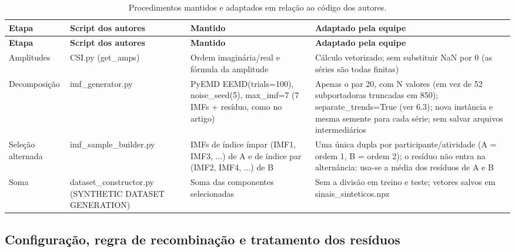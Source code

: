 {\footnotesize
\begin{longtable}{|>{\centering\arraybackslash}p{1.92cm}|>{\centering\arraybackslash}p{2.76cm}|>{\centering\arraybackslash}p{4.18cm}|>{\centering\arraybackslash}p{5.35cm}|}
\caption{Procedimentos mantidos e adaptados em relação ao código dos autores.}\\
\hline
\textbf{Etapa} & \textbf{Script dos autores} & \textbf{Mantido} & \textbf{Adaptado pela equipe} \\ \hline
\endfirsthead
\hline
\textbf{Etapa} & \textbf{Script dos autores} & \textbf{Mantido} & \textbf{Adaptado pela equipe} \\ \hline
\endhead
Amplitudes & CSI.py (get\_amps) & Ordem imaginária/real e fórmula da amplitude & Cálculo vetorizado; sem substituir NaN por 0 (as séries são todas finitas) \\ \hline
Decomposição & imf\_generator.py & PyEMD EEMD(trials=100), noise\_seed(5), max\_imf=7 (7 IMFs + resíduo, como no artigo) & Apenas o par 20, com N valores (em vez de 52 subportadoras truncadas em 850); separate\_trends=True (ver 6.3); nova instância e mesma semente para cada série; sem salvar arquivos intermediários \\ \hline
Seleção alternada & imf\_sample\_builder.py & IMFs de índice ímpar (IMF1, IMF3, ...) de A e de índice par (IMF2, IMF4, ...) de B & Uma única dupla por participante/atividade (A = ordem 1, B = ordem 2); o resíduo não entra na alternância: usa-se a média dos resíduos de A e B \\ \hline
Soma & dataset\_constructor.py (SYNTHETIC DATASET GENERATION) & Soma das componentes selecionadas & Sem a divisão em treino e teste; vetores salvos em sinais\_sinteticos.npz \\ \hline
\end{longtable}
}

\subsection{Configuração, regra de recombinação e tratamento dos resíduos}

